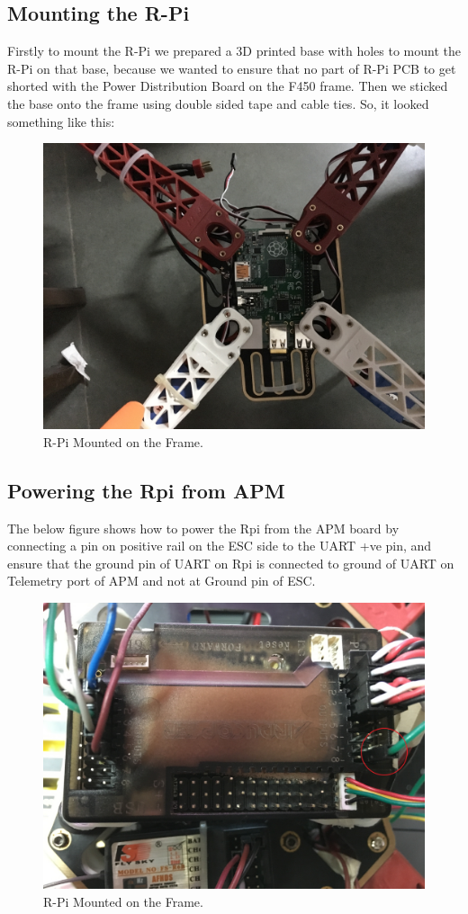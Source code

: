 \documentclass[11pt,a4paper]{article}
\begin{document}
	 \subsection{Mounting the R-Pi}
	 	Firstly to mount the R-Pi we prepared a 3D printed base with holes to mount the R-Pi on that base, because we wanted to ensure that no part of R-Pi PCB to get shorted with the Power Distribution Board on the F450 frame. Then we sticked the base onto the frame using double sided tape and cable ties. So, it looked something like this:
	 	\begin{figure}[H]
	 	
	 	\centering
		\includegraphics[scale=0.10]{Rpi}
	 	\caption{R-Pi Mounted on the Frame.}
\end{figure}
	 	\subsection{Powering the Rpi from APM}
	 	The below figure shows how to power the Rpi from the APM board by connecting a pin on positive rail on the ESC side to the UART +ve pin, and ensure that the ground pin of UART on Rpi is connected to ground of UART on Telemetry port of APM and not at Ground pin of ESC.
	 	\begin{figure}[H]
	 	\centering
		\includegraphics[scale=0.10]{apm}
	 	\caption{R-Pi Mounted on the Frame.}
\end{figure}
\end{document}
